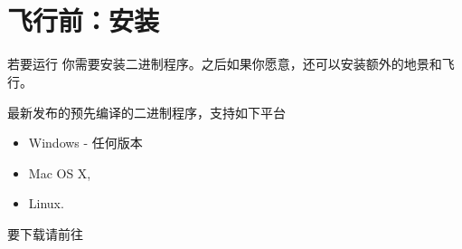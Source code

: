 
\ifchinese
\chapter{{\\}飞行前：安装 \FlightGear{}}
\fi
{}
\label{prefligh}

\ifchinese
若要运行 \FlightGear{} 你需要安装二进制程序。之后如果你愿意，还可以安装额外的地景和飞行。

最新发布的预先编译的二进制程序，支持如下平台

\begin{itemize}
\item Windows - 任何版本
\item Mac OS X,
\item Linux.
\end{itemize}

要下载请前往


